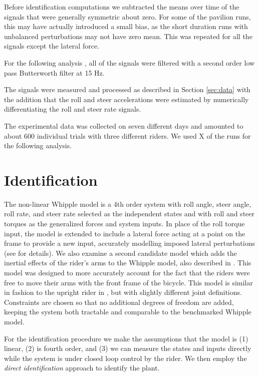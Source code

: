 \documentclass[a4paper]{article}
\begin{document}
Before identification computations we subtracted the means over time of the
signals that were generally symmetric about zero. For some of the pavilion
runs, this may have actually introduced a small bias, as the short duration
runs with unbalanced perturbations may not have zero mean. This was repeated 
for all the signals except the lateral force.

For the following analysis%
, all of the signals were filtered with a second order
low pass Butterworth filter at 15 Hz. 

The signals were measured and processed as described in Section \ref{sec:data}
with the addition that the roll and steer accelerations were estimated by
numerically differentiating the roll and steer rate signals.


The experimental data was collected on seven different days and amounted to
about 600 individual trials with three different riders. We used X of the 
runs for the following analysis.

\section{Identification}
\label{sec:identification}

The non-linear Whipple model is a 4th order system with roll angle, steer
angle, roll rate, and steer rate selected as the independent states and with
roll and steer torques as the generalized forces and system inputs. In place of
the roll torque input, the model is extended to include a lateral force acting
at a point on the frame to provide a new input, accurately modelling imposed
lateral perturbations (see \cite{Moore2012} for details).  We also examine a
second candidate model which adds the inertial effects of the rider's arms to
the Whipple model, also described in \cite{Moore2012}. This model was designed
to more accurately account for the fact that the riders were free to move their
arms with the front frame of the bicycle. This model is similar in fashion to
the upright rider in \cite{Schwab2010a}, but with slightly different joint
definitions. Constraints are chosen so that no additional degrees of freedom
are added, keeping the system both tractable and comparable to the benchmarked
Whipple model.

For the identification procedure we make the assumptions that the model is (1)
linear, (2) is fourth order, and (3) we can measure the states and inputs
directly while the system is under closed loop control by the rider. We then
employ the \emph{direct identification} approach to identify the plant.
\end{document}
